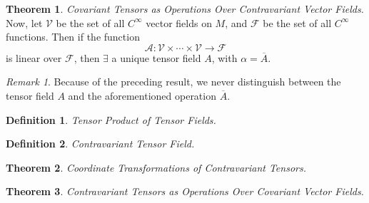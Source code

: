 \documentclass[10pt,landscape]{article}
\theoremstyle{definition}
\newtheorem{definition}{Definition}[section]
\theoremstyle{theorem}
\newtheorem{theorem}{Theorem}[section]
\theoremstyle{summary}
\theoremstyle{remark}
\newtheorem*{remark}{Remark}
\newcommand{\Ci}{C^\infty}
\begin{document}
\begin{multicols*}{3}
\begin{theorem}{\textit{Covariant Tensors as Operations Over Contravariant Vector Fields.}}
    Now, let $\mathcal{V}$ be the set of all $\Ci$ vector fields on $M$, and $\mathcal{F}$ be the set of all $\Ci$ functions. Then if the function
    \begin{equation}
        \mathcal{A}:\mathcal{V}\times\cdots\times\mathcal{V}\rightarrow\mathcal{F}
    \end{equation}
    is linear over $\mathcal{F}$, then $\exists$ a unique tensor field $A$, with $\alpha=\overline{A}$.
\end{theorem}

\begin{remark}
    Because of the preceding result, we never distinguish between the tensor field $A$ and the aforementioned operation $\overline{A}$.
\end{remark}

\theoremstyle{definition}
\begin{definition}{\textit{Tensor Product of Tensor Fields.}}

\end{definition}

\theoremstyle{definition}
\begin{definition}{\textit{Contravariant Tensor Field.}}
    
\end{definition}

\theoremstyle{theorem}
\begin{theorem}{\textit{Coordinate Transformations of Contravariant Tensors.}}
    
\end{theorem}

\theoremstyle{theorem}
\begin{theorem}{\textit{Contravariant Tensors as Operations Over Covariant Vector Fields.}}
\end{theorem}
 
\end{multicols*}
\end{document}
